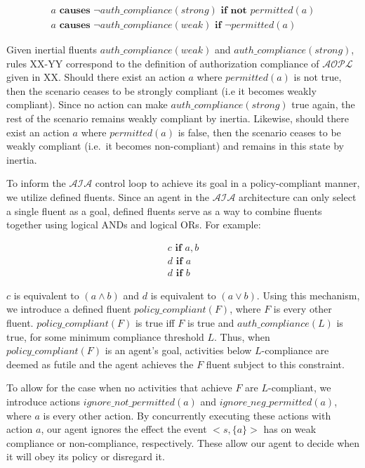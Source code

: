 \begin{gather}
    a \textbf{ causes } \neg auth\_compliance(strong) \textbf{ if not } permitted(a) \\
    a \textbf{ causes } \neg auth\_compliance(weak) \textbf{ if } \neg permitted(a)
\end{gather}

Given inertial fluents $auth\_compliance(weak)$ and $auth\_compliance(strong)$, rules XX-YY correspond to the definition of authorization compliance of $\mathcal{AOPL}$ given in XX.
Should there exist an action $a$ where $permitted(a)$ is not true, then the scenario ceases to be strongly compliant (i.e it becomes weakly compliant).
Since no action can make $auth\_compliance(strong)$ true again, the rest of the scenario remains weakly compliant by inertia.
Likewise, should there exist an action $a$ where $permitted(a)$ is false, then the scenario ceases to be weakly compliant (i.e.~it becomes non-compliant) and remains in this state by inertia.

To inform the $\mathcal{AIA}$ control loop to achieve its goal in a policy-compliant manner, we utilize defined fluents.
Since an agent in the $\mathcal{AIA}$ architecture can only select a single fluent as a goal, defined fluents serve as a way to combine fluents together using logical ANDs and logical ORs.
For example:

\begin{gather}
    c \textbf{ if } a, b \\
    d \textbf{ if } a \\
    d \textbf{ if } b
\end{gather}

$c$ is equivalent to $(a \land b)$ and $d$ is equivalent to $(a \lor b)$.
Using this mechanism, we introduce a defined fluent $policy\_compliant(F)$, where $F$ is every other fluent.
$policy\_compliant(F)$ is true iff $F$ is true and $auth\_compliance(L)$ is true, for some minimum compliance threshold $L$.
Thus, when $policy\_compliant(F)$ is an agent's goal, activities below $L$-compliance are deemed as futile and the agent achieves the $F$ fluent subject to this constraint.

To allow for the case when no activities that achieve $F$ are $L$-compliant, we introduce actions $ignore\_not\_permitted(a)$ and $ignore\_neg\_permitted(a)$, where $a$ is every other action.
By concurrently executing these actions with action $a$, our agent ignores the effect the event $<s, \{a\}>$ has on weak compliance or non-compliance, respectively.
These allow our agent to decide when it will obey its policy or disregard it.

